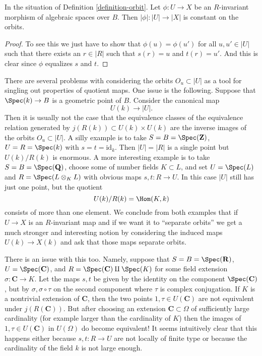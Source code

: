 \begin{lemma}
\label{lemma-invariant-map-constant-on-orbit}
In the situation of Definition \ref{definition-orbit}.
Let $\phi : U \to X$ be an $R$-invariant morphism of algebraic spaces over
$B$. Then $|\phi| : |U| \to |X|$ is constant on the orbits.
\end{lemma}

\begin{proof}
To see this we just have to show that $\phi(u) = \phi(u')$
for all $u, u' \in |U|$ such that
there exists an $r \in |R|$ such that $s(r) = u$ and $t(r) = u'$.
And this is clear since $\phi$ equalizes $s$ and $t$.
\end{proof}

\noindent
There are several problems with considering the orbits $O_u \subset |U|$
as a tool for singling out properties of quotient maps. One issue is the
following. Suppose that $\Spec(k) \to B$
is a geometric point of $B$. Consider the canonical map
$$
U(k) \longrightarrow |U|.
$$
Then it is usually not the case that the equivalence classes
of the equivalence relation generated by $j(R(k)) \subset U(k) \times U(k)$
are the inverse images of the orbits $O_u \subset |U|$.
A silly example is to take $S = B = \Spec(\mathbf{Z})$,
$U = R = \Spec(k)$ with $s = t = \text{id}_k$. Then $|U| = |R|$ is
a single point but $U(k)/R(k)$ is enormous.
A more interesting example is to take $S = B = \Spec(\mathbf{Q})$,
choose some of number fields $K \subset L$, and set $U = \Spec(L)$
and $R = \Spec(L \otimes_K L)$ with obvious maps $s, t : R \to U$.
In this case $|U|$ still has just one point, but the quotient
$$
U(k)/R(k) = \Hom(K, k)
$$
consists of more than one element. We conclude from both examples
that if $U \to X$ is an $R$-invariant map and if we want it to
``separate orbits'' we get a much stronger and interesting notion by
considering the induced maps $U(k) \to X(k)$ and ask that
those maps separate orbits.

\medskip\noindent
There is an issue with this too. Namely, suppose that
$S = B = \Spec(\mathbf{R})$,
$U = \Spec(\mathbf{C})$, and
$R = \Spec(\mathbf{C}) \amalg \Spec(K)$
for some field extension $\sigma : \mathbf{C} \to K$.
Let the maps $s, t$ be given by the identity on the component
$\Spec(\mathbf{C})$, but by $\sigma, \sigma \circ \tau$ on the
second component where $\tau$ is complex conjugation. If
$K$ is a nontrivial extension of $\mathbf{C}$, then the two points
$1, \tau \in U(\mathbf{C})$ are not equivalent under
$j(R(\mathbf{C}))$. But after choosing an extension $\mathbf{C} \subset \Omega$
of sufficiently large cardinality (for example larger than the cardinality
of $K$) then the images of $1, \tau \in U(\mathbf{C})$ in
$U(\Omega)$ do become equivalent! It seems intuitively clear that
this happens either because $s, t : R \to U$ are not locally of finite type
or because the cardinality of the field $k$ is not large enough.

